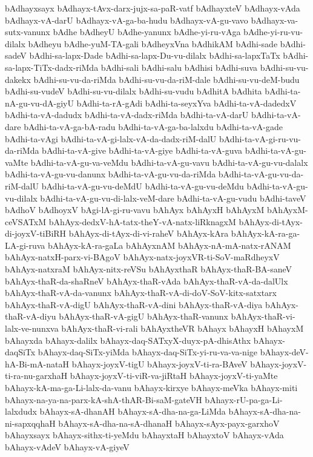 {bAdhayxsayx
bAdhayx-tAvx-darx-jujx-sa-paR-vatf
bAdhayxteV
bAdhayx-vAda
bAdhayx-vA-darU
bAdhayx-vA-ga-ba-hudu
bAdhayx-vA-gu-vavo
bAdhayx-va-sutx-vanunx
bAdhe
bAdheyU
bAdhe-yanunx
bAdhe-yi-ru-vAga
bAdhe-yi-ru-vu-dilalx
bAdheyu
bAdhe-yuM-TA-gali
bAdheyxVna
bAdhikAM
bAdhi-sade
bAdhi-sadeV
bAdhi-sa-lapx-Dade
bAdhi-sa-lapx-Du-vu-dilalx
bAdhi-sa-lapxTaTx
bAdhi-sa-lapx-TiTx-dadx-riMda
bAdhi-sali
bAdhi-salu
bAdhisi
bAdhi-suva
bAdhi-su-vu-dakekx
bAdhi-su-vu-da-riMda
bAdhi-su-vu-da-riM-dale
bAdhi-su-vu-deM-budu
bAdhi-su-vudeV
bAdhi-su-vu-dilalx
bAdhi-su-vudu
bAdhitA
bAdhita
bAdhi-ta-nA-gu-vu-dA-giyU
bAdhi-ta-rA-gAdi
bAdhi-ta-seyxYva
bAdhi-ta-vA-dadedxV
bAdhi-ta-vA-dadudx
bAdhi-ta-vA-dadx-riMda
bAdhi-ta-vA-darU
bAdhi-ta-vA-dare
bAdhi-ta-vA-ga-bA-radu
bAdhi-ta-vA-ga-ba-lalxdu
bAdhi-ta-vA-gade
bAdhi-ta-vAgi
bAdhi-ta-vA-gi-lalx-vA-da-dadx-riM-dalU
bAdhi-ta-vA-gi-ru-vu-da-riMda
bAdhi-ta-vA-give
bAdhi-ta-vA-giye
bAdhi-ta-vA-guva
bAdhi-ta-vA-gu-vaMte
bAdhi-ta-vA-gu-va-veMdu
bAdhi-ta-vA-gu-vavu
bAdhi-ta-vA-gu-vu-dalalx
bAdhi-ta-vA-gu-vu-danunx
bAdhi-ta-vA-gu-vu-da-riMda
bAdhi-ta-vA-gu-vu-da-riM-dalU
bAdhi-ta-vA-gu-vu-deMdU
bAdhi-ta-vA-gu-vu-deMdu
bAdhi-ta-vA-gu-vu-dilalx
bAdhi-ta-vA-gu-vu-di-lalx-veM-dare
bAdhi-ta-vA-gu-vudu
bAdhi-taveV
bAdhoV
bAdhoyxV
bAgi-lA-gi-ru-vavu
bAhAyx
bAhAyxH
bAhAyxM
bAhAyxM-ceVSATxM
bAhAyx-dedxV-hA-tatx-theY-vA-natx-liRknagxM
bAhAyx-di-tAyx-di-joyxV-tiBiRH
bAhAyx-di-tAyx-di-vi-raheV
bAhAyx-kAra
bAhAyx-kA-ra-ga-LA-gi-ruva
bAhAyx-kA-ra-gaLa
bAhAyxnAM
bAhAyx-nA-mA-natx-rANAM
bAhAyx-natxH-parx-vi-BAgoV
bAhAyx-natx-joyxVR-ti-SoV-maRdheyxV
bAhAyx-natxraM
bAhAyx-nitx-reVSu
bAhAyxthaR
bAhAyx-thaR-BA-saneV
bAhAyx-thaR-da-shaRneV
bAhAyx-thaR-vAda
bAhAyx-thaR-vA-da-dalUlx
bAhAyx-thaR-vA-da-vanunx
bAhAyx-thaR-vA-di-doV-SoV-kitx-satxtarx
bAhAyx-thaR-vA-digU
bAhAyx-thaR-vA-dini
bAhAyx-thaR-vA-diya
bAhAyx-thaR-vA-diyu
bAhAyx-thaR-vA-gigU
bAhAyx-thaR-vanunx
bAhAyx-thaR-vi-lalx-ve-nunxva
bAhAyx-thaR-vi-rali
bAhAyxtheVR
bAhayx
bAhayxH
bAhayxM
bAhayxda
bAhayx-dalilx
bAhayx-daq-SATxyX-duyx-pA-dhisAthx
bAhayx-daqSiTx
bAhayx-daq-SiTx-yiMda
bAhayx-daq-SiTx-yi-ru-va-va-nige
bAhayx-deV-hA-Bi-mA-nataH
bAhayx-joyxV-tigU
bAhayx-joyxV-ti-ra-BAveV
bAhayx-joyxV-ti-ra-nu-garxhaH
bAhayx-joyxV-ti-viR-va-jiRtaH
bAhayx-joyxV-ti-yaMte
bAhayx-kA-ma-ga-Li-lalx-da-vanu
bAhayx-kirxye
bAhayx-meVka
bAhayx-miti
bAhayx-na-ya-na-parx-kA-shA-thAR-Bi-saM-gateVH
bAhayx-rU-pa-ga-Li-lalxdudx
bAhayx-sA-dhanAH
bAhayx-sA-dha-na-ga-LiMda
bAhayx-sA-dha-na-ni-sapxqqhaH
bAhayx-sA-dha-na-sA-dhanaH
bAhayx-sAyx-payx-garxhoV
bAhayxsayx
bAhayx-sithx-ti-yeMdu
bAhayxtaH
bAhayxtoV
bAhayx-vAda
bAhayx-vAdeV
bAhayx-vA-giyeV
}
